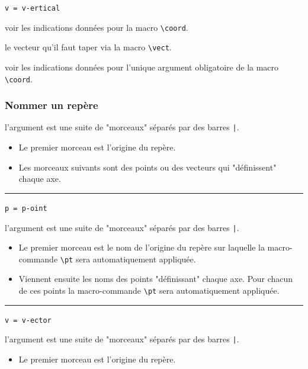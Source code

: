 \documentclass[12pt,a4paper]{book}
\newcommand\env[1]{\texttt{#1}}
\newcommand\macro[1]{\env{\textbackslash{}#1}}
\theoremstyle{definition}
\newcommand\separation{
	\medskip
	\hfill\rule{0.5\textwidth}{0.75pt}\hfill
	\medskip
}
\newcommand\mwhyprefix[2]{%
	\texttt{#1 = #1-#2}%
}
\begin{document}
{{ \hfill \mwhyprefix{v}{ertical}

\IDoption{} voir les indications données pour la macro \macro{coord}.

 le vecteur qu'il faut taper via la macro \macro{vect}.

 voir les indications données pour l'unique argument obligatoire de la macro \macro{coord}.


\subsubsection{Nommer un repère}





\IDarg{} l'argument est une suite de "morceaux" séparés par des barres \verb+|+.

\begin{itemize}[topsep=0pt]
	\item Le premier morceau est l'origine du repère.

	\item Les morceaux suivants sont des points ou des vecteurs qui "définissent" chaque axe.
\end{itemize}


\separation

 \hfill \mwhyprefix{p}{oint}

\IDarg{} l'argument est une suite de "morceaux" séparés par des barres \verb+|+.

\begin{itemize}[topsep=0pt]
	\item Le premier morceau est le nom de l'origine du repère sur laquelle la macro-commande \macro{pt} sera automatiquement appliquée.

	\item Viennent ensuite les noms des points "définissant" chaque axe. Pour chacun de ces points la macro-commande \macro{pt} sera automatiquement appliquée.
\end{itemize}


\separation

 \hfill \mwhyprefix{v}{ector}

\IDarg{} l'argument est une suite de "morceaux" séparés par des barres \verb+|+.

\begin{itemize}[topsep=0pt]
	\item Le premier morceau est l'origine du repère.


\end{itemize}}}
\end{document}

